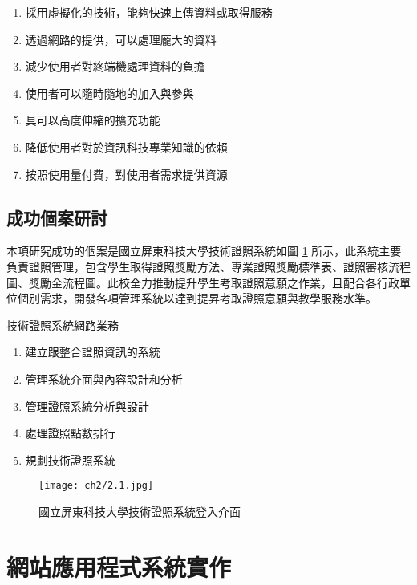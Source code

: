 \begin{enumerate}[noitemsep]
\item 採用虛擬化的技術，能夠快速上傳資料或取得服務
\item 透過網路的提供，可以處理龐大的資料
\item 減少使用者對終端機處理資料的負擔
\item 使用者可以隨時隨地的加入與參與
\item 具可以高度伸縮的擴充功能
\item 降低使用者對於資訊科技專業知識的依賴
\item 按照使用量付費，對使用者需求提供資源
\end{enumerate}


  \section{成功個案研討}

本項研究成功的個案是國立屏東科技大學技術證照系統如圖 \ref{fig:屏科大} 所示，此系統主要負責證照管理，包含學生取得證照獎勵方法、專業證照獎勵標準表、證照審核流程圖、獎勵金流程圖。此校全力推動提升學生考取證照意願之作業，且配合各行政單位個別需求，開發各項管理系統以達到提昇考取證照意願與教學服務水準。

技術證照系統網路業務

\begin{enumerate}[noitemsep]
\item 建立跟整合證照資訊的系統
\item 管理系統介面與內容設計和分析
\item 管理證照系統分析與設計
\item 處理證照點數排行
\item 規劃技術證照系統 
\end{enumerate}

\begin{figure}[h]
\centering \texttt{[image: ch2/2.1.jpg]}
\caption{\label{fig:屏科大}國立屏東科技大學技術證照系統登入介面}
\end{figure}


\chapter{網站應用程式系統實作}

